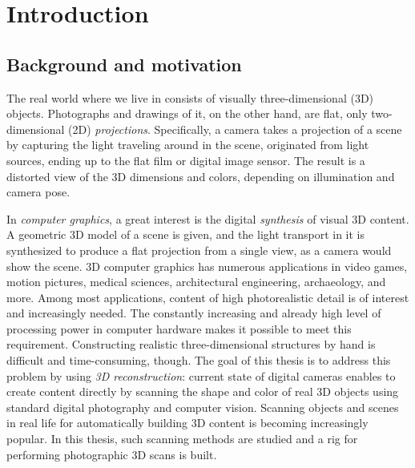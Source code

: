 \section{Introduction}

\thispagestyle{empty}

\subsection{Background and motivation}


The real world where we live in consists of visually three-dimensional (3D) objects.
Photographs and drawings of it, on the other hand, are flat, only two-dimensional (2D) \emph{projections}.
Specifically, a camera takes a projection of a scene by capturing the light traveling around in the scene, originated from light sources, ending up to the flat film or digital image sensor.
The result is a distorted view of the 3D dimensions and colors, depending on illumination and camera pose.


In \emph{computer graphics}, a great interest is the digital \emph{synthesis} of visual 3D content.
A geometric 3D model of a scene is given, and the light transport in it is synthesized to produce a flat projection from a single view, as a camera would show the scene.
3D computer graphics has numerous applications in video games, motion pictures, medical sciences, architectural engineering, archaeology, and more.
Among most applications, content of high photorealistic detail is of interest and increasingly needed.
The constantly increasing and already high level of processing power in computer hardware makes it possible to meet this requirement.
Constructing realistic three-dimensional structures by hand is difficult and time-consuming, though.
The goal of this thesis is to address this problem by using \emph{3D reconstruction}: current state of digital cameras enables to create content directly by scanning the shape and color of real 3D objects using standard digital photography and computer vision.
Scanning objects and scenes in real life for automatically building 3D content is becoming increasingly popular.
In this thesis, such scanning methods are studied and a rig for performing photographic 3D scans is built.


